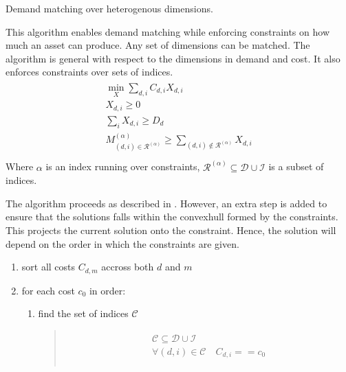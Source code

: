 \documentclass[letterpaper,10pt,english]{sphinxmanual}
\begin{document}
\begin{fulllineitems}
\label{\detokenize{api:muse.demand_matching.demand_matching}}
Demand matching over heterogenous dimensions.

This algorithm enables demand matching while enforcing constraints on how much an
asset can produce. Any set of dimensions can be matched. The algorithm is general
with respect to the dimensions in demand and cost. It also enforces constraints over
sets of indices.
\begin{align*}\!\begin{aligned}
\min_{X} \sum_{d, i} C_{d, i} X_{d, i}\\
X_{d, i} \geq 0\\
\sum_i X_{d, i} \geq D_d\\
M_{(d, i) \in \mathcal{R}^{(\alpha)}}^{(\alpha)}
    \geq \sum_{(d, i)\notin\mathcal{R}^{(\alpha)}} X_{d, i}\\
\end{aligned}\end{align*}
Where \(\alpha\) is an index running over constraints,
\(\mathcal{R}^{(\alpha)}\subseteq\mathcal{D}\cup\mathcal{I}\) is a subset of
indices.

The algorithm proceeds as described in .
However, an extra step is added to ensure that the solutions falls within the
convex\sphinxhyphen{}hull formed by the constraints. This projects the current solution onto the
constraint. Hence, the solution will depend on the order in which the constraints
are given.
\begin{enumerate}
%
\item {} 
sort all costs \(C_{d, m}\) accross both \(d\) and \(m\)

\item {} 
for each cost \(c_0\) in order:
\begin{enumerate}
%
\item {} 
find the set of indices \(\mathcal{C}\)
\begin{quote}
\begin{align*}\!\begin{aligned}
\mathcal{C}\subseteq\mathcal{D}\cup\mathcal{I}\\
\forall (d, i) \in \mathcal{C}\quad C_{d, i} == c_0\\
\end{aligned}\end{align*}\end{quote}


\end{enumerate}
\end{enumerate}
\end{fulllineitems}
\end{document}
